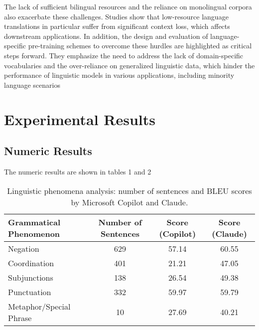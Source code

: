\documentclass[twocolumn]{article}
\newcommand{\en}[1]{\foreignlanguage{english}{#1}}
\begin{document}
{The lack of sufficient bilingual resources and the reliance on monolingual corpora also exacerbate these challenges. Studies show that low-resource language translations in particular suffer from significant context loss, which affects downstream applications. In addition, the design and evaluation of language-specific pre-training schemes to overcome these hurdles are highlighted as critical steps forward. They emphasize the need to address the lack of domain-specific vocabularies and the over-reliance on generalized linguistic data, which hinder the performance of linguistic models in various applications, including minority language scenarios \cite{Khade2024}}

\section{\en{Experimental Results}}

\subsection{\en{Numeric Results}}
\en{The numeric results are shown in tables 1 and 2}
\renewcommand{\arraystretch}{1.5} %
\setlength{\tabcolsep}{10pt} %
\begin{table*}[ht]
    \centering
    \begin{tabular}{|l|c|c|c|}
        \hline
        \textbf{\en{Grammatical Phenomenon}} & \textbf{\en{Number of Sentences}} & \textbf{\en{Score (Copilot)}} & \textbf{\en{Score (Claude)}} \\
        \hline
        \en{Negation}            & 629  & 57.14  & 60.55  \\
        \en{Coordination}  & 401  & 21.21  & 47.05 \\
        \en{Subjunctions}        & 138  & 26.54 & 49.38  \\
        \en{Punctuation}   & 332 & 59.97 & 59.79 \\
        \en{Metaphor/Special Phrase}        & 10  & 27.69  & 40.21  \\
        \hline
    \end{tabular}
    \caption{\en{Linguistic phenomena analysis: number of sentences and BLEU scores by Microsoft Copilot and Claude.}}
    \label{tab:grammatical_analysis}
\end{table*}
\end{document}
